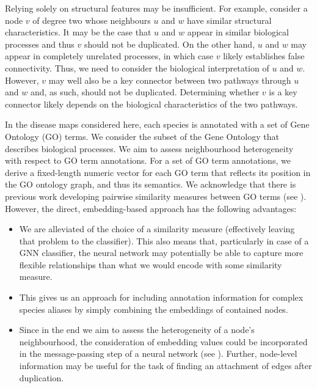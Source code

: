 \documentclass[
	fontsize=10pt, %
	twoside=true, %
	secnumdepth=1, %
  toc=indentunnumbered %
]{kaobook}
\begin{document}
Relying solely on structural features may be insufficient. For example, consider
a node $v$ of degree two whose neighbours $u$ and $w$ have similar structural
characteristics. It may be the case that $u$ and $w$ appear in similar
biological processes and thus $v$ should not be duplicated. On the other hand,
$u$ and $w$ may appear in completely unrelated processes, in which case $v$
likely establishes false connectivity. Thus, we need to consider the biological
interpretation of $u$ and $w$. However, $v$ may well also be a key connector
between two pathways through $u$ and $w$ and, as such, should not be duplicated.
Determining whether $v$ is a key connector likely depends on the biological
characteristics of the two pathways.

In the disease maps considered here, each species is annotated with a set of
Gene Ontology (GO) terms. We consider the subset of the Gene Ontology that describes
biological processes. We aim to assess neighbourhood heterogeneity with respect
to GO term annotations.
%
For a set of GO term annotations, we derive a fixed-length numeric
 vector for each GO term that reflects its position in the GO
ontology graph, and thus its semantics. We acknowledge that there is previous
work developing pairwise similarity measures between GO terms (see
). However, the direct, embedding-based approach has
the following advantages:
%
\begin{itemize}
\item We are alleviated of the choice of a similarity measure
  (effectively leaving that problem to the classifier). This also means that,
  particularly in case of a GNN classifier, the neural network may potentially
  be able to capture more flexible relationships than what we would encode with
  some similarity measure.
\item This gives us an approach for including annotation information for
  complex species aliases by simply combining the embeddings of contained nodes.
\item Since in the end we aim to assess the heterogeneity of a node's
  neighbourhood, the consideration of embedding values could be incorporated in
  the message-passing step of a neural network (see ). Further,
  node-level information may be useful for the task of finding an attachment of
  edges after duplication.
\end{itemize}
\end{document}
